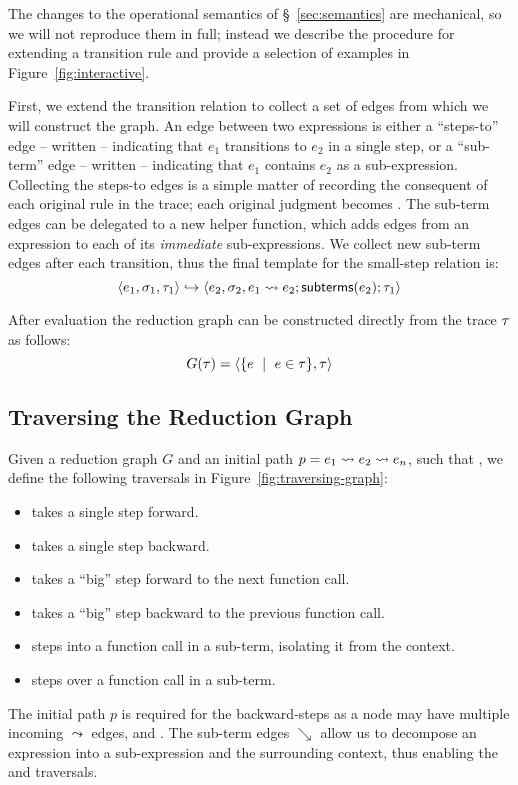 %
The changes to the operational semantics of \S~\ref{sec:semantics} are
mechanical, so we will not reproduce them in full; instead we describe
the procedure for extending a transition rule and provide a selection of
examples in Figure~\ref{fig:interactive}.

First, we extend the transition relation to collect a set of edges from
which we will construct the graph.
%
An edge between two expressions is either a ``steps-to'' edge -- written
 -- indicating that $e_1$ transitions to $e_2$ in a
single step, or a ``sub-term'' edge -- written  --
indicating that $e_1$ contains $e_2$ as a sub-expression.
%
Collecting the steps-to edges is a simple matter of recording the
consequent of each original rule in the trace; each original judgment
 becomes
.
%
The sub-term edges can be delegated to a new \subtermssym helper
function, which adds edges from an expression to each of its
\emph{immediate} sub-expressions.
%
We collect new sub-term edges after each transition, thus the final
template for the small-step relation is:
\[
\langle e_1, \sigma_1, \tau_1 \rangle \hookrightarrow \langle e_2, \sigma_2, e_1 \leadsto e_2; \mathsf{subterms}(e_2); \tau_1 \rangle
\]

After evaluation the reduction graph can be constructed directly from
the trace $\tau$ as follows:
\[
G(\tau) = \langle \{e \ \mid \  e \in \tau\}, \tau \rangle
\]

\subsection{Traversing the Reduction Graph}
\label{sec:traversing-graph}
Given a reduction graph $G$ and an initial path
$p = e_1 \leadsto e_2 \leadsto e_n$, such that
, we define the following
traversals in Figure~\ref{fig:traversing-graph}:
%
\begin{itemize}
\item \stepforwardsym takes a single step forward.
\item \stepbackwardsym takes a single step backward.
\item \jumpforwardsym takes a ``big'' step forward to the next function call.
\item \jumpbackwardsym takes a ``big'' step backward to the previous function call.
\item \stepintosym steps into a function call in a sub-term, isolating it from the context.
\item \stepoversym steps over a function call in a sub-term.
\end{itemize}
%
The initial path $p$ is required for the backward-steps as a node may
have multiple incoming $\leadsto$ edges, \eg
{} and .
%
The sub-term edges $\searrow$ allow us to decompose an expression into a
sub-expression and the surrounding context, thus enabling the \stepintosym
and \stepoversym traversals.
%


